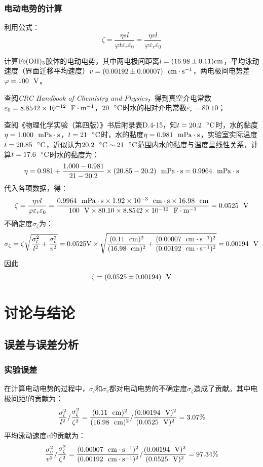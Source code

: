 \documentclass[12pt]{article}
\begin{document}
		\subsubsection{电动电势的计算}
		利用公式：
		$$
		\zeta=\frac{\eta s l}{\varphi t \varepsilon_{r} \varepsilon_{0}}=\frac{\eta v l}{\varphi  \varepsilon_{r} \varepsilon_{0}}
		$$
		\par
		计算$\rm Fe(OH)_{3}$胶体的电动电势，其中两电极间距离$l=(16.98\pm 0.11){\rm cm}$，平均泳动速度（界面迁移平均速度）$v=(0.00192\pm 0.00007)\ \ {\rm cm\cdot s^{-1}}$，两电极间电势差$\varphi=100\ \ {\rm V}$。\par
		查阅\textit{CRC Handbook of Chemistry and Physics}\citealp{crc}，得到真空介电常数$\varepsilon_{0}=8.8542\times 10^{-12}\ \ {\rm F\cdot m^{-1}}$，$20\ \ {\rm ^{\circ}C}$时水的相对介电常数$\varepsilon_{r}=80.10$；\par
		查阅《物理化学实验（第四版）》书后附录表D.4-15\citealp{textbook}，知$t=20.2\ \ {\rm ^{\circ}C}$时，水的黏度$\eta=1.000\ \ {\rm mPa\cdot s}$，$t=21\ \ {\rm ^{\circ}C}$时，水的黏度$\eta=0.981\ \ {\rm mPa\cdot s}$，实验室实际温度$t=20.85\ \ {\rm ^{\circ}C}$，近似认为$20.2\ \ {\rm ^{\circ}C\sim 21\ \ ^{\circ}C}$范围内水的黏度与温度呈线性关系，计算$t=17.6\ \ {\rm ^ {\circ}C}$时水的黏度为：
		$$
		\eta=0.981+\frac{1.000-0.981}{21-20.2}\times (20.85-20.2)\ \ {\rm mPa\cdot s}=0.9964\ \ {\rm mPa\cdot s}
		$$
		代入各项数据，得：
		$$
		\zeta=\frac{\eta v l}{\varphi  \varepsilon_{r} \varepsilon_{0}}=\frac{0.9964\ \ {\rm mPa\cdot s} \times 1.92\times 10^{-3}\ \ {\rm cm\cdot s} \times 16.98\ \ {\rm cm}}{100\ \ {\rm V}  \times 80.10 \times 8.8542\times 10^{-12}\ \ {\rm F\cdot m^{-1}}}=0.0525\ \ {\rm V}
		$$
		不确定度$\sigma_{\zeta}$为：
		$$
		\sigma_{\zeta}=\zeta\sqrt{\frac{\sigma_{l}^{2}}{l^{2}}+\frac{\sigma_{v}^{2}}{v^{2}}}=0.0525 {\rm V}\times\sqrt{\frac{(0.11\ \ {\rm cm})^{2}}{(16.98\ \ {\rm cm})^{2}}+\frac{(0.00007\ \ {\rm cm\cdot s^{-1}})^{2}}{(0.00192\ \ {\rm cm\cdot s^{-1}})^{2}}}=0.00194\ \ {\rm V}
		$$
		因此
		$$
		\zeta=(0.0525\pm 0.00194)\ \ {\rm V}
		$$
 	\section{讨论与结论}
	 \subsection{误差与误差分析}
		\subsubsection{实验误差}
		在计算电动电势的过程中，$\sigma_{l}$和$\sigma_{v}$都对电动电势的不确定度$\sigma_{\zeta}$造成了贡献。其中电极间距$l$的贡献为：
		$$
		\frac{\sigma_{l}^{2}}{l^{2}} / \frac{\sigma_{\zeta}^{2}}{\zeta^{2}} = \frac{(0.11\ \ {\rm cm})^{2}}{(16.98\ \ {\rm cm})^{2}} / \frac{(0.00194\ \ {\rm V})^{2}}{(0.0525\ \ {\rm V})^{2}} = 3.07\%
		$$
		平均泳动速度$v$的贡献为：
		$$
		\frac{\sigma_{v}^{2}}{v^{2}} / \frac{\sigma_{\zeta}^{2}}{\zeta^{2}} = \frac{(0.00007\ \ {\rm cm\cdot s^{-1}})^{2}}{(0.00192\ \ {\rm cm\cdot s^{-1}})^{2}} / \frac{(0.00194\ \ {\rm V})^{2}}{(0.0525\ \ {\rm V})^{2}} = 97.34\%
		$$
\end{document}

